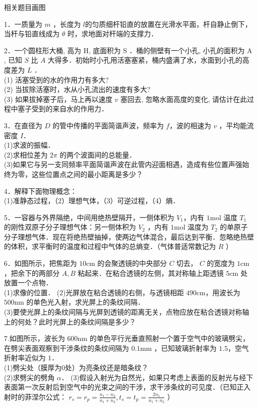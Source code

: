 
\begin{issues}
相关题目画图
\end{issues}

1．一质量为 $m$ ，长度为 $l$的匀质细杆铅直的放置在光滑水平面，杆自静止倒下，当杆与铅直线成为 $\theta$ 时，求地面对杆端的支撑力．

2．一个圆柱形大桶, 高为 $\mathrm{H}$, 底面积为 $\mathrm{S}$ ．桶的侧壁有一个小孔, 小孔的面积为 $\mathrm{A}$, 已知 $S$ 比 $A$ 大得多．初始时小孔用活塞塞紧，桶内盛满了水，水面到小孔的高度差为 $L$ ．\\
(1) 活塞受到的水的作用力有多大? \\
(2) 当拔除活塞时，水从小孔流出的速度有多大? \\
(3) 如果拔掉塞子后，马上再以速度 $v$ 塞回去, 忽略水面高度的变化, 请估计在此过程中塞子受到的来自水的作用力．

3．在直径为 $D$ 的管中传播的平面简谐声波，频率为 $f$，波的相速为 $v$ ，平均能流密度 $I$．\\
(1)求波的振幅．\\
(2)求相位差为 $2\pi$ 的两个波面间的总能量．\\
(3)如果它与另一支同频率平面简谐声波在此管内迎面相遇，造成有些位置声强始终为零，这些位置点之间的最小距离是多少？

4．解释下面物理概念：\\
(1)准静态过程，（2）理想气体，（3）可逆过程，（4）熵．

5．一容器与外界隔绝，中间用绝热壁隔开，一侧体积为 $V_1$，内有 $1\mathrm{mol}$ 温度 $T_1$ 的刚性双原子分子理想气体：另一侧体积为 $V_2$ ，内有 $1\mathrm{mol}$ 温度为 $T_2$ 的单原子分子理想气体．现在将绝热壁抽掉，使两边气体混合，最后达到平衡．忽略绝热壁的体积，求平衡时的温度和过程中气体的总熵变．（气体普适常数记为 $R$ ）

6．如图所示，把焦距为 $10\mathrm{cm}$ 的会聚透镜的中央部分 $C$ 切去， $C$ 的宽度为 $1\mathrm{cm}$ ，把余下的两部分 $A,B$ 粘起来．在粘合透镜的左侧，其对称轴上距透镜 $5\mathrm{cm}$ 处放置一个点物．\\
(1)求像的位置．
(2)光屏放在粘合透镜的右侧，与透镜相距 $490\mathrm{cm}$，用波长为 $500\mathrm{nm}$ 的单色光入射，求光屏上的条纹间隔．\\
(3)要使光屏上的条纹间隔与光屏到透镜的距离无关，点物应放在粘合透镜对称轴上的何处？此时光屏上的条纹间隔是多少？

7.如图所示，波长为 $600\mathrm{nm}$ 的单色平行光垂直照射一个置于空气中的玻璃劈尖，在劈尖表面观察到干涉条纹的条纹间隔为 $0.1\mathrm{mm}$ ，已知玻璃折射率为 $1.5$，空气折射率近似为 $1$．\\
(1)劈尖处（膜厚为0处）为亮条纹还是暗条纹？\\
(2)求劈尖的劈角 $\alpha$．
(3)假设入射光为自然光，如果只考虑上表面的反射光与经下表面第一次反射后到空气中的光束之间的干涉，求干涉条纹的可见度．（已知正入射时的菲涅尔公式： $r_s=r_p=\frac{n_1-n_2}{n_1+n_2},t_s=t_p=\frac{2n_1}{n_1+n_2}$ ）


